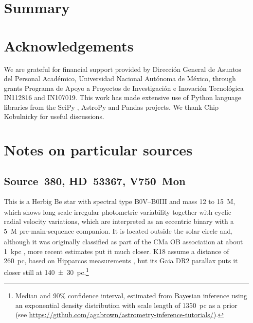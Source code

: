 \documentclass[useAMS, usenatbib, a4paper]{mnras}
\begin{document}
\section{Summary}
\label{sec:conclusions}


\section*{Acknowledgements}
We are grateful for financial support provided by Dirección General de
Asuntos del Personal Académico, Universidad Nacional Autónoma de
México, through grants Programa de Apoyo a Proyectos de Investigación
e Inovación Tecnológica IN112816 and IN107019.  This work has made
extensive use of Python language libraries from the SciPy
\citep{Jones:2001a}, AstroPy \citep{Astropy-Collaboration:2013a,
  Astropy-Collaboration:2018a} and Pandas \citep{McKinney:2010a}
projects.  We thank Chip Kobulnicky for useful discussions.





\appendix


\section{Notes on particular sources}
\label{sec:notes-part-sourc}

\subsection{Source~380, HD~53367, V750~Mon}
\label{sec:hd-53367-v750}
  
This is a Herbig Be star with spectral type B0V--B0III and mass 12 to
\SI{15}{M_\odot}, which shows long-scale irregular photometric
variability \citep{Tjin-A-Djie:2001a, Pogodin:2006a} together with
cyclic radial velocity variations, which are interpreted as an
eccentric binary with a \SI{5}{M_\odot} pre-main-sequence companion.
It is located outside the solar circle and, although it was originally
classified as part of the CMa OB association at about \SI{1}{kpc}
\citep{Tjin-A-Djie:2001a}, more recent estimates put it much closer.
K18 assume a distance of \SI{260}{pc}, based on Hipparcos measurements
\citep{van-Leeuwen:2007a}, but its Gaia DR2 parallax
\citep{Gaia-Collaboration:2016a, Gaia-Collaboration:2018a, Luri:2018a}
puts it closer still at \SI{140 \pm 30}{pc}.\footnote{%
  Median and 90\% confidence interval, estimated from Bayesian
  inference using an exponential density distribution with scale
  length of \SI{1350}{pc} as a prior (see
  \url{https://github.com/agabrown/astrometry-inference-tutorials/}). }
\end{document}
